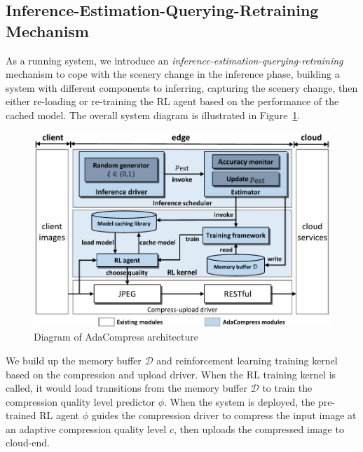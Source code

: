 \subsection{Inference-Estimation-Querying-Retraining Mechanism}

As a running system, we introduce an \emph{inference-estimation-querying-retraining} mechanism to cope with the scenery change in the inference phase, building a system with different components to inferring, capturing the scenery change, then either re-loading or re-training the RL agent based on the performance of the cached model. The overall system diagram is illustrated in Figure~\ref{fig: diagram}.


\begin{figure}[htbp]
	\centerline{\includegraphics[width=0.8\linewidth]{figures/overall-diagram.pdf}}
	\vspace{0.2cm}
	\caption{Diagram of AdaCompress architecture}
	\label{fig: diagram}
\end{figure}

We build up the memory buffer $ \mathcal{D} $ and reinforcement learning training kernel based on the compression and upload driver. When the RL training kernel is called, it would load transitions from the memory buffer $ \mathcal{D} $ to train the compression quality level predictor $ \phi $. When the system is deployed, the pre-trained RL agent $ \phi $ guides the compression driver to compress the input image at an adaptive compression quality level $ c $, then uploads the compressed image to cloud-end. %


